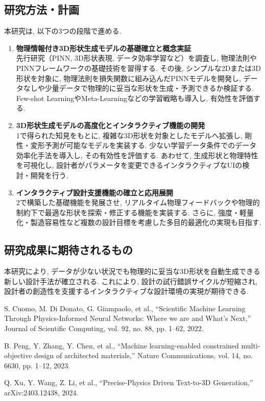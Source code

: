 \documentclass[dvipdfmx]{jsarticle}
\begin{document}
\subsection{研究方法・計画}
本研究は, 以下の3つの段階で進める.

\begin{enumerate}[itemsep=0pt,topsep=2pt,parsep=0pt,partopsep=0pt]
    \item {\rmfamily\normalsize\bfseries 物理情報付き3D形状生成モデルの基礎確立と概念実証}\\
          先行研究（PINN, 3D形状表現, データ効率学習など）を調査し, 物理法則やPINNフレームワークの基礎技術を習得する. その後, シンプルな2Dまたは3D形状を対象に, 物理法則を損失関数に組み込んだPINNモデルを開発し, データなしや少量データで物理的に妥当な形状を生成・予測できるか検証する. Few-shot LearningやMeta-Learningなどの学習戦略も導入し, 有効性を評価する.

    \item {\rmfamily\normalsize\bfseries 3D形状生成モデルの高度化とインタラクティブ機能の開発}\\
          1で得られた知見をもとに, 複雑な3D形状を対象としたモデルへ拡張し, 剛性・変形予測が可能なモデルを実装する. 少ない学習データ条件でのデータ効率化手法を導入し, その有効性を評価する. あわせて, 生成形状と物理特性を可視化し, 設計者がパラメータを変更できるインタラクティブなUIの検討・開発を行う.

    \item {\rmfamily\normalsize\bfseries インタラクティブ設計支援機能の確立と応用展開}\\
          2で構築した基礎機能を発展させ, リアルタイム物理フィードバックや物理的制約下で最適な形状を探索・修正する機能を実装する. さらに, 強度・軽量化・製造容易性など複数の設計目標を考慮した多目的最適化の実現も目指す.
\end{enumerate}

\subsection{研究成果に期待されるもの}
本研究により, データが少ない状況でも物理的に妥当な3D形状を自動生成できる新しい設計手法が確立される. これにより, 設計の試行錯誤サイクルが短縮され, 設計者の創造性を支援するインタラクティブな設計環境の実現が期待できる.

\begin{thebibliography}{99}
    S. Cuomo, M. Di Donato, G. Giampaolo, et al.,
    ``Scientific Machine Learning Through Physics-Informed Neural Networks: Where we are and What's Next,''
    Journal of Scientific Computing, vol. 92, no. 88, pp. 1–62, 2022.

    B. Peng, Y. Zhang, Y. Chen, et al.,
    ``Machine learning-enabled constrained multi-objective design of architected materials,''
    Nature Communications, vol. 14, no. 6630, pp. 1–12, 2023.

    Q. Xu, Y. Wang, Z. Li, et al.,
    ``Precise-Physics Driven Text-to-3D Generation,''
    arXiv:2403.12438, 2024.
\end{thebibliography}
\end{document}

